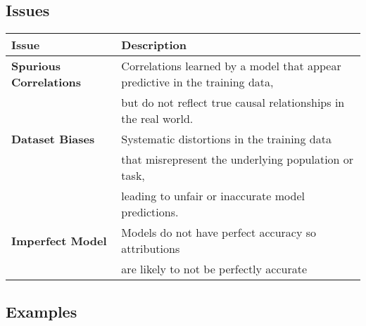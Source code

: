 \subsection{Issues}
\begin{summary}
    \begin{center}
        \begin{tabular}{ll}
            \toprule
            \textbf{Issue} & \textbf{Description} \\
            \midrule
            \textbf{Spurious Correlations} & Correlations learned by a model that appear predictive in the training data, \\
            & but do not reflect true causal relationships in the real world. \\
            \midrule
            \textbf{Dataset Biases} & Systematic distortions in the training data \\
            & that misrepresent the underlying population or task, \\
            & leading to unfair or inaccurate model predictions. \\
            \midrule
            \textbf{Imperfect Model} & Models do not have perfect accuracy so attributions \\
            & are likely to not be perfectly accurate \\
            \bottomrule
        \end{tabular}
    \end{center}
\end{summary}
\newpage

\subsection{Examples}
